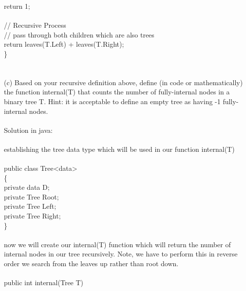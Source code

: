 \documentclass{article}
\newcommand*\moveToRight[1]{\hspace*{0em plus 1fill}\makebox{(#1)}}
\newcommand*\fixindent{ \hspace{1pt}\\}
\begin{document}
\hspace*{180pt} return 1;\\\\
\hspace*{165pt}// Recursive Process \\
\hspace*{165pt}// pass through both children which are also trees \\
\hspace*{165pt} return leaves(T.Left) + leaves(T.Right);\\
\hspace*{150pt}\}\\\\

\newpage
\fixindent{}
(c) Based on your recursive definition above, define (in code or mathematically) the function internal(T)
that counts the number of fully-internal nodes in a binary tree T. Hint: it is acceptable to define an empty
tree as having -1 fully-internal nodes. \moveToRight{4 marks}\\\\Solution in java:\\
\\establishing the tree data type which will be used in our function internal(T) \\\\
\hspace*{150pt}public class Tree\textless  data\textgreater\\
\hspace*{150pt}\{\\
\hspace*{165pt} private data D;\\
\hspace*{165pt} private Tree Root;\\
\hspace*{165pt} private Tree Left;\\
\hspace*{165pt} private Tree Right;\\
\hspace*{150pt}\}\\\\
now we will create our internal(T) function which will return
the number of internal nodes in our tree recursively. Note, we have to perform this in reverse order we search from the leaves up rather than root down.\\\\
\hspace*{150pt}public int internal(Tree T)\\
\end{document}
